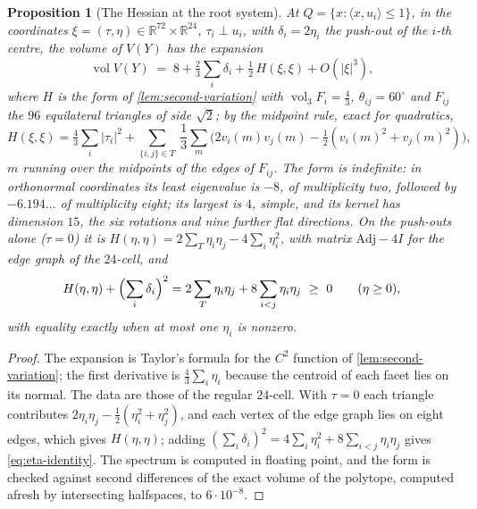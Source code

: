 \documentclass[11pt,reqno]{amsart}
\renewcommand{\_}{\origunderscore\allowbreak}
\numberwithin{equation}{section}
\theoremstyle{plain}
\newtheorem{prop}[thm]{Proposition}
\theoremstyle{definition}
\theoremstyle{remark}
\DeclareMathOperator{\vol}{vol}
\begin{document}
\begin{prop}[The Hessian at the root system]\label{prop:hessian-d4}
At $Q=\{x:\langle x,u_i\rangle\le1\}$, in the coordinates
$\xi=(\tau,\eta)\in\mathbb R^{72}\times\mathbb R^{24}$, $\tau_i\perp u_i$, with
$\delta_i=2\eta_i$ the push-out of the $i$-th centre, the volume of $V(Y)$ has
the expansion
\[
  \vol V(Y)\;=\;8+\tfrac23\sum_i\delta_i+\tfrac12\,H(\xi,\xi)+O(|\xi|^3),
\]
where $H$ is the form of \cref{lem:second-variation} with $\vol_3F_i=\tfrac43$,
$\theta_{ij}=60^\circ$ and $F_{ij}$ the $96$ equilateral triangles of side
$\sqrt2$; by the midpoint rule, exact for quadratics,
\[
  H(\xi,\xi)=\tfrac43\sum_i|\tau_i|^2
  +\sum_{\{i,j\}\in T}\ \frac{1}{3}\sum_{m}
  \bigl(2v_i(m)v_j(m)-\tfrac12(v_i(m)^2+v_j(m)^2)\bigr),
\]
$m$ running over the midpoints of the edges of $F_{ij}$. The form is
indefinite: in orthonormal coordinates its least eigenvalue is $-8$, of
multiplicity two, followed by $-6.194\ldots$ of multiplicity eight; its
largest is $4$, simple, and its kernel has dimension $15$, the six rotations and nine
further flat directions. On the push-outs alone ($\tau=0$) it is
$H(\eta,\eta)=2\sum_{T}\eta_i\eta_j-4\sum_i\eta_i^2$, with matrix
$\mathrm{Adj}-4I$ for the edge graph of the $24$-cell, and
\begin{equation}\label{eq:eta-identity}
  H(\eta,\eta)+\Bigl(\sum_i\delta_i\Bigr)^2=2\sum_{T}\eta_i\eta_j+8\sum_{i<j}\eta_i\eta_j\ \ge\ 0
  \qquad(\eta\ge0),
\end{equation}
with equality exactly when at most one $\eta_i$ is nonzero.
\end{prop}

\begin{proof}
The expansion is Taylor's formula for the $C^2$ function of
\cref{lem:second-variation}; the first derivative is $\frac43\sum_i\eta_i$
because the centroid of each facet lies on its normal. The data are those of
the regular $24$-cell. With $\tau=0$ each triangle contributes
$2\eta_i\eta_j-\frac12(\eta_i^2+\eta_j^2)$, and each vertex of the edge graph
lies on eight edges, which gives $H(\eta,\eta)$; adding
$(\sum_i\delta_i)^2=4\sum_i\eta_i^2+8\sum_{i<j}\eta_i\eta_j$ gives
\eqref{eq:eta-identity}. The spectrum is computed in floating point, and
the form is checked against second differences of the exact volume of the
polytope, computed afresh by intersecting halfspaces, to $6\cdot10^{-8}$.
\end{proof}
\end{document}
